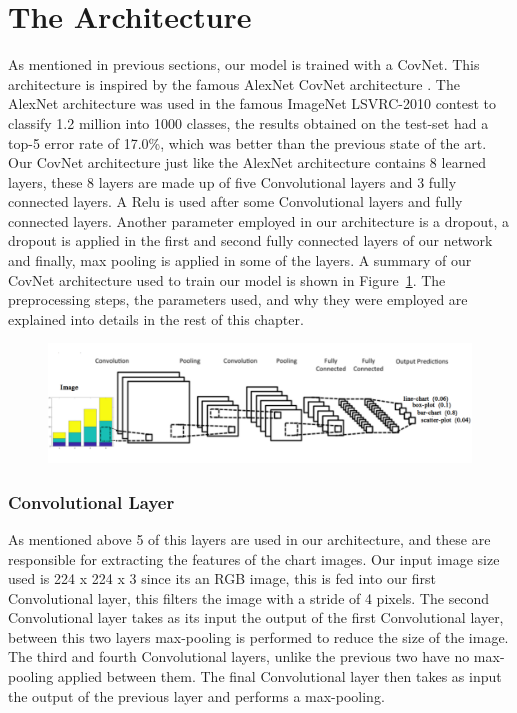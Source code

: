 \documentclass[12pt, a4paper,oneside]{report}
\begin{document}
\section{The Architecture}
As mentioned in previous sections, our model is trained with a CovNet. This architecture is inspired by the famous AlexNet CovNet architecture  \cite{krizhevsky2012imagenet}. The AlexNet architecture was used in the famous ImageNet LSVRC-2010 contest to classify 1.2 million into 1000 classes, the results obtained on the test-set had a top-5 error rate of 17.0\%, which was better than the previous state of the art. Our CovNet architecture just like the AlexNet architecture contains 8 learned layers, these 8 layers are made up of five Convolutional layers and 3 fully connected layers. A Relu is used after some Convolutional layers and fully connected layers. Another parameter employed in our architecture is a dropout, a dropout is applied in the first and second fully connected layers of our network and finally, max pooling is applied in some of the layers. A summary of our CovNet architecture used to train our model is shown in Figure~\ref{fig:archi}. The preprocessing steps, the parameters used, and why they were employed are explained into details in the rest of this chapter.

\begin{figure}
\centering
\includegraphics [scale=0.3] {architecture}
\label{fig:archi}
\end{figure}

\subsubsection{Convolutional Layer}
As mentioned above 5 of this layers are used in our architecture, and these are responsible for extracting the  features of the chart images. Our input image size used is 224 x 224 x 3  since its an RGB image, this is fed into our first Convolutional layer, this filters the image with a stride of 4 pixels. The second Convolutional layer takes as its input the output of the first Convolutional layer, between this two layers max-pooling is performed to reduce the size of the image. The third and fourth Convolutional layers, unlike the previous two have no max-pooling applied between them. The final Convolutional layer then takes as input the output of the previous layer and performs a max-pooling.
\end{document}

